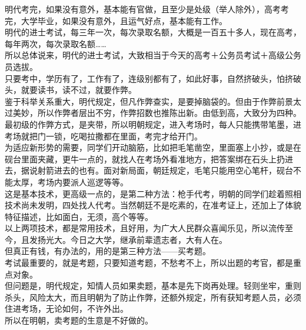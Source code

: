 \begin{multicols}{\theparacolNo}
明代考完，如果没有意外，基本能有官做，且至少是处级（举人除外），高考考完，大学毕业，如果没有意外，且运气好点，基本能有工作。\\

明代的进士考试，每三年一次，每次录取名额，大概是一百五十多人，现在高考，每年两次，每次录取名额……\\

所以总体说来，明代的进士考试，大致相当于今天的高考＋公务员考试＋高级公务员选拔。\\

只要考中，学历有了，工作有了，连级别都有了，如此好事，自然挤破头，怕挤破头，就要读书，读不过，就要作弊。\\

鉴于科举关系重大，明代规定，但凡作弊查实，是要掉脑袋的。但由于作弊前景太过美妙，所以作弊者层出不穷，作弊招数也推陈出新。由低到高，大致分为四种。\\

最初级的作弊方式，是夹带，所以明朝规定，进入考场时，每人只能携带笔墨，进考场就把门一锁，吃喝拉撒都在里面，考完才给开门。\\

为适应新形势的需要，同学们开动脑筋，比如把毛笔凿空，里面塞上小抄，或是在砚台里面夹藏，更牛一点的，就找人在考场外看准地方，把答案绑在石头上扔进去，据说射箭进去的也有。面对新局面，朝廷规定，毛笔只能用空心笔杆，砚台不能太厚，考场内要派人巡逻等等。\\

这是基本技术，更高级一点的，是第二种方法：枪手代考，明朝的同学们趁着照相技术尚未发明，四处找人代考。当然朝廷不是吃素的，在准考证上，还加上了体貌特征描述，比如面白，无须，高个等等。\\

以上两项技术，都是常用技术，且好用，为广大人民群众喜闻乐见，所以流传至今，且发扬光大。今日之大学，继承前辈遗志者，大有人在。\\

但真正有钱，有办法的，用的是第三种方法——买考题。\\

考试最重要的，就是考题，只要知道考题，不愁考不上，所以出题的考官，都是重点对象。\\

但问题是，明代规定，知情人员如果卖题，基本是先下岗再处理。轻则坐牢，重则杀头，风险太大，而且明朝为了防止作弊，还额外规定，所有获知考题人员，必须住进考场，无论如何，不许外出。\\

所以在明朝，卖考题的生意是不好做的。\\


\end{multicols}
